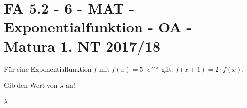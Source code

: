 \section{FA 5.2 - 6 - MAT - Exponentialfunktion - OA - Matura 1. NT 2017/18}

\begin{beispiel}[FA 5.2]{1}
Für eine Exponentialfunktion $f$ mit $f(x)=5\cdot e^{\lambda\cdot x}$ gilt: $f(x+1)=2\cdot f(x)$.

Gib den Wert von $\lambda$ an!\leer

$\lambda=$\,
\end{beispiel}